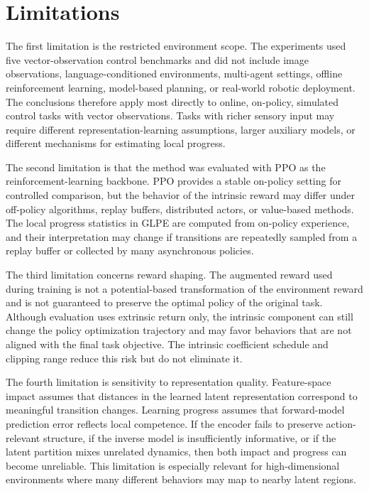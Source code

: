\section{Limitations}
\label{sec:conclusion_limitations}

The first limitation is the restricted environment scope.
The experiments used five vector-observation control benchmarks and did not include image observations, language-conditioned environments, multi-agent settings, offline reinforcement learning, model-based planning, or real-world robotic deployment.
The conclusions therefore apply most directly to online, on-policy, simulated control tasks with vector observations.
Tasks with richer sensory input may require different representation-learning assumptions, larger auxiliary models, or different mechanisms for estimating local progress.

The second limitation is that the method was evaluated with PPO as the reinforcement-learning backbone.
PPO provides a stable on-policy setting for controlled comparison, but the behavior of the intrinsic reward may differ under off-policy algorithms, replay buffers, distributed actors, or value-based methods.
The local progress statistics in GLPE are computed from on-policy experience, and their interpretation may change if transitions are repeatedly sampled from a replay buffer or collected by many asynchronous policies.

The third limitation concerns reward shaping.
The augmented reward used during training is not a potential-based transformation of the environment reward and is not guaranteed to preserve the optimal policy of the original task.
Although evaluation uses extrinsic return only, the intrinsic component can still change the policy optimization trajectory and may favor behaviors that are not aligned with the final task objective.
The intrinsic coefficient schedule and clipping range reduce this risk but do not eliminate it.

The fourth limitation is sensitivity to representation quality.
Feature-space impact assumes that distances in the learned latent representation correspond to meaningful transition changes.
Learning progress assumes that forward-model prediction error reflects local competence.
If the encoder fails to preserve action-relevant structure, if the inverse model is insufficiently informative, or if the latent partition mixes unrelated dynamics, then both impact and progress can become unreliable.
This limitation is especially relevant for high-dimensional environments where many different behaviors may map to nearby latent regions.

